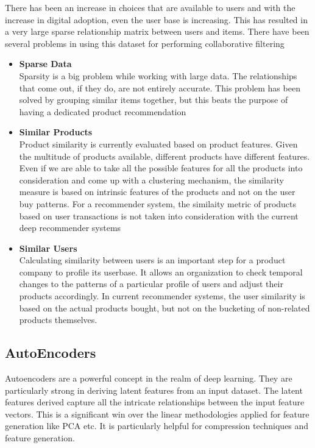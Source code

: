 \documentclass[letterpaper,twocolumn,10pt]{article}
\begin{document}
There has been an increase in choices that are available to users and with the increase in digital adoption, even the user base is increasing. This has resulted in a very large sparse relationship matrix between users and items. There have been several problems in using this dataset
for performing collaborative filtering

\begin{itemize}
\item \textbf{Sparse Data} \\
Sparsity is a big problem while working with large data. The relationships that come out, if they do, are not entirely accurate. This problem has been solved by grouping similar items together, but this beats the purpose of having a dedicated product recommendation

\item \textbf{Similar Products} \\
Product similarity is currently evaluated based on product features. Given the multitude of products available, different products have different features. Even if we are able to take all the possible features for all the products into consideration and come up with a clustering mechanism, the similarity measure is based on intrinsic features of the products and not on the user buy patterns. For a recommender system, the similaity metric of products based on user transactions is not taken into consideration with the current deep recommender systems

\item \textbf{Similar Users} \\
Calculating similarity between users is an important step for a product company to profile its userbase. It allows an organization to check temporal changes to the patterns of a particular profile of users and adjust their products accordingly. In current recommender systems, the user similarity is based on the actual products bought, but not on the bucketing of non-related products themselves.

\end{itemize}

\subsection{AutoEncoders}
Autoencoders are a powerful concept in the realm of deep learning. They are particularly strong in deriving latent features from an input dataset. The latent features derived capture all the intricate relationships between the input feature vectors. This is a significant win over the linear methodologies applied for feature generation like PCA etc. It is particularly helpful for compression techniques and feature generation. 
\end{document}
